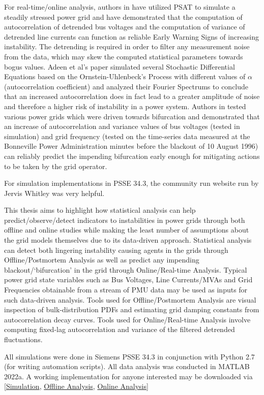 For real-time/online analysis, authors in \cite{ghanvati01} have utilized PSAT \cite{psatMilano} to simulate a steadily stressed power grid and have demonstrated that the computation of autocorrelation of detrended bus voltages and the computation  of variance of detrended line currents can function as reliable Early Warning Signs of increasing instability. The detrending is required in order to filter any measurement noise from the data, which may skew the computed statistical parameters towards bogus values. Adeen et al's paper \cite{adeen01} simulated several Stochastic Differential Equations based on the Ornstein-Uhlenbeck's Process with different values of $\alpha$ (autocorrelation coefficient) and analyzed their Fourier Spectrums to conclude that an increased autocorrelation does in fact lead to a greater amplitude of noise and therefore a higher risk of instability in a power system. Authors in \cite{sanchez01} tested various power grids which were driven towards bifurcation and demonstrated that an increase of autocorrelation and variance values of bus voltages (tested in simulation) and grid frequency (tested on the time-series data measured at the Bonneville Power Administration minutes before the blackout of 10 August 1996) can reliably predict the impending bifurcation early enough for mitigating actions to be taken by the grid operator.

For simulation implementations in PSSE 34.3, the community run website run by Jervis Whitley \cite{psspyWebsite} was very helpful.

This thesis aims to highlight how statistical analysis can help predict/observe/detect indicators to instabilities in power grids through both offline and online studies while making the least number of assumptions about the grid models themselves due to its data-driven approach. Statistical analysis can detect both lingering instability causing agents in the grids through Offline/Postmortem Analysis as well as predict any impending blackout/`bifurcation' in the grid through Online/Real-time Analysis. Typical power grid state variables such as Bus Voltages, Line Currents/MVAs and Grid Frequencies obtainable from a stream of PMU data may be used as inputs for such data-driven analysis. Tools used for Offline/Postmortem Analysis are visual inspection of bulk-distribution PDFs and estimating grid damping constants from autocorrelation decay curves. Tools used for Online/Real-time Analysis involve computing fixed-lag autocorrelation and variance of the filtered detrended fluctuations.

All simulations were done in Siemens PSSE 34.3 in conjunction with Python 2.7 (for writing automation scripts). All data analysis was conducted in MATLAB 2022a. A working implementation for anyone interested may be downloaded via [\href{https://t.ly/HwAT}{Simulation}, \href{https://t.ly/e1f9}{Offline Analysis}, \href{https://t.ly/u_Mp}{Online Analysis}]